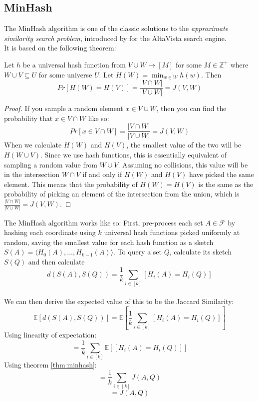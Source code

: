 \subsection{MinHash}
The MinHash algorithm is one of the classic solutions to the \textit{approximate similarity search problem}, introduced by \citet{broder1997minhash} for the AltaVista search engine.\\
It is based on the following theorem:
\begin{theorem}
    \label{thm:minhash}
    Let $h$ be a universal hash function from $V \cup W \rightarrow [M]$ for some $M \in \mathbb{Z}^+$ where $W\cup V\subseteq U$ for some universe $U$. 
    Let $H(W)=\min_{w\in W} h(w)$. Then
    $$Pr[H(W)=H(V)]=\frac{|V\cap W|}{|V \cup W|}= J(V,W)$$
\end{theorem}
\begin{proof}
    If you sample a random element $x \in V \cup W$, then you can find the probability that $x \in V\cap W$ like so:
    $$Pr[x\in V \cap W]=\frac{|V\cap W|}{|V \cup W|}= J(V,W)$$
    When we calculate $H(W)$ and $H(V)$, the smallest value of the two will be $H(W\cup V)$. Since we use hash functions, this is essentially equivalent of sampling a random value from $W\cup V$. Assuming no collisions, this value will be in the intersection $W\cap V$ if and only if $H(W)$ and $H(V)$ have picked the same element. This means that the probability of $H(W)=H(V)$ is the same as the probability of picking an element of the intersection from the union, which is $\frac{|V\cap W|}{|V\cup W|}=J(V,W)$.
\end{proof}
The MinHash algorithm works like so: First, pre-process each set $A\in \mathcal{F}$ by hashing each coordinate using $k$ universal hash functions picked uniformly at random, saving the smallest value for each hash function as a sketch $S(A)=\langle H_0(A), \dots, H_{k-1}(A)\rangle$.
To query a set $Q$, calculate its sketch $S(Q)$ and then calculate $$d(S(A),S(Q))=\frac{1}{k}\sum_{i\in [k]}[H_i(A)=H_i(Q)]$$\\
We can then derive the expected value of this to be the Jaccard Similarity:
$$\mathbb{E}[d(S(A),S(Q))]=\mathbb{E}[\frac{1}{k}\sum_{i\in [k]}[H_i(A)=H_i(Q)]]$$
Using linearity of expectation:
$$=\frac{1}{k}\sum_{i\in [k]}\mathbb{E}[[H_i(A)=H_i(Q)]]$$
Using theorem \ref{thm:minhash}:
$$=\frac{1}{k}\sum_{i\in [k]}J(A,Q)$$
$$=J(A,Q)$$
